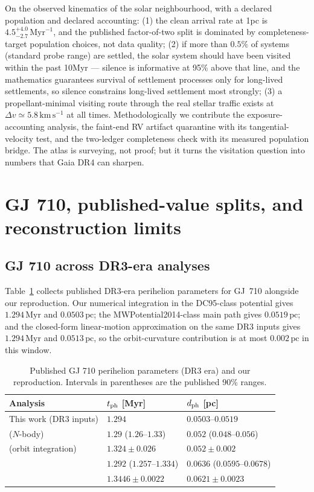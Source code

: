 \documentclass[11pt]{article}
\newcommand{\Myr}{\,\mathrm{Myr}}
\newcommand{\pc}{\,\mathrm{pc}}
\newcommand{\kms}{\,\mathrm{km\,s^{-1}}}
\begin{document}
On the observed kinematics of the solar neighbourhood, with a declared
population and declared accounting: (1) the clean arrival rate at 1\;pc is
$4.5^{+4.0}_{-2.7}\Myr^{-1}$, and the published factor-of-two split is
dominated by completeness-target population choices, not data quality;
(2) if more than $0.5\%$ of systems (standard probe range) are settled, the
solar system should have been visited within the past 10\;Myr --- silence is
informative at 95\% above that line, and the mathematics guarantees
survival of settlement processes only for long-lived settlements, so
silence constrains long-lived settlement most strongly; (3) a
propellant-minimal visiting route through the real stellar traffic exists
at $\Delta v\simeq5.8\kms$ at all times. Methodologically we contribute the
exposure-accounting analysis, the faint-end RV artifact quarantine with its
tangential-velocity test, and the two-ledger completeness check with its
measured population bridge. The atlas is surveying, not proof; but it
turns the visitation question into numbers that Gaia DR4 can sharpen.

\appendix

\section{GJ 710, published-value splits, and reconstruction limits}
\label{app:gj710}

\subsection{GJ 710 across DR3-era analyses}\label{app:gj710tab}
Table~\ref{tab:gj710} collects published DR3-era perihelion parameters for
GJ~710 alongside our reproduction. Our numerical integration in the
DC95-class potential gives $1.294\Myr$ and $0.0503\pc$; the
MWPotential2014-class main path gives $0.0519\pc$; and the closed-form
linear-motion approximation on the same DR3 inputs gives $1.294\Myr$ and
$0.0513\pc$, so the orbit-curvature contribution is at most $0.002\pc$ in
this window.

\begin{table}[h]\centering
\begin{tabular}{lll}
\toprule
Analysis & $t_{\rm ph}$ [Myr] & $d_{\rm ph}$ [pc] \\
\midrule
This work (DR3 inputs) & $1.294$ & $0.0503$--$0.0519$ \\
\cite{dlfm22} ($N$-body) & $1.29$ ($1.26$--$1.33$) & $0.052$ ($0.048$--$0.056$) \\
\cite{bb22} (orbit integration) & $1.324\pm0.026$ & $0.052\pm0.002$ \\
\cite{bj22} & $1.292$ ($1.257$--$1.334$) & $0.0636$ ($0.0595$--$0.0678$) \\
\cite{fp26} & $1.3446\pm0.0022$ & $0.0621\pm0.0023$ \\
\bottomrule
\end{tabular}
\caption{Published GJ 710 perihelion parameters (DR3 era) and our
reproduction. Intervals in parentheses are the published 90\% ranges.}
\label{tab:gj710}
\end{table}
\end{document}
